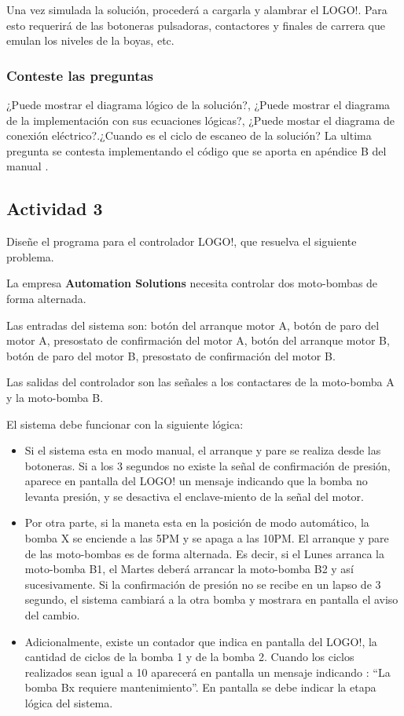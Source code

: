 Una vez simulada la solución, procederá a cargarla y alambrar el LOGO!. Para esto requerirá de las botoneras pulsadoras, contactores y finales de carrera que emulan los niveles de la boyas, etc. 

\subsubsection{Conteste las preguntas}

¿Puede mostrar el diagrama lógico de la solución?, ¿Puede mostrar el diagrama de la implementación con sus  ecuaciones lógicas?, ¿Puede mostar el diagrama de conexión eléctrico?.¿Cuando es el ciclo de escaneo de la solución? La ultima pregunta se contesta implementando el código que se aporta en apéndice B del manual \cite{LOGO1}.

\subsection{Actividad 3}
Diseñe el programa para el controlador LOGO!, que resuelva el siguiente problema.

La empresa \textbf{Automation Solutions} necesita controlar dos moto-bombas de forma alternada.

Las entradas del sistema son:  botón del arranque motor A, botón de paro del motor A,  presostato de confirmación del motor A, botón del arranque motor B, botón de paro del motor B,  presostato de confirmación del motor B. 

Las salidas del controlador son las señales a los contactares de la moto-bomba A y la moto-bomba B.

El sistema debe funcionar con la siguiente lógica:

\begin{itemize}
	\item Si el sistema esta en modo manual, el arranque y pare se realiza desde las botoneras. Si a los 3 segundos no existe la señal de confirmación de presión, aparece en pantalla del LOGO! un mensaje indicando que la bomba no levanta presión, y se desactiva el enclave-miento de  la señal del motor.
	\item Por otra parte, si la maneta esta en la posición de modo automático, la bomba X se enciende a las 5PM y se apaga a las 10PM. El arranque y pare de las moto-bombas es de forma alternada. Es decir, si el Lunes arranca la  moto-bomba B1, el Martes deberá arrancar la moto-bomba B2 y así sucesivamente. Si la confirmación de presión no se recibe en un lapso de 3 segundo, el sistema cambiará a la otra bomba y mostrara en pantalla el aviso del cambio.	
	\item Adicionalmente, existe un  contador que indica en pantalla del LOGO!, la cantidad de ciclos de la bomba 1 y de la bomba 2. Cuando los ciclos realizados sean igual a 10 aparecerá en pantalla un mensaje indicando : “La bomba Bx requiere mantenimiento”. En pantalla se debe indicar la etapa lógica del sistema.
\end{itemize} 




